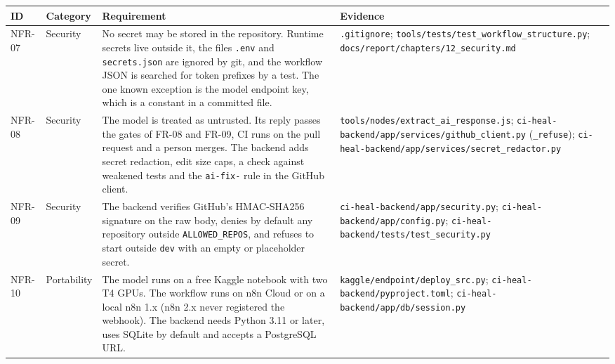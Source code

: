 \begin{table}[!htbp]
\centering
\footnotesize
\begin{tabularx}{\linewidth}{>{\raggedright\arraybackslash}p{1.4cm}>{\raggedright\arraybackslash}p{2.3cm}>{\raggedright\arraybackslash}X>{\raggedright\arraybackslash}X}
\toprule
\textbf{ID} & \textbf{Category} & \textbf{Requirement} & \textbf{Evidence} \\
\midrule
NFR-07 & Security & No secret may be stored in the repository. Runtime secrets live outside it, the files \texttt{.env} and \texttt{secrets.json} are ignored by git, and the workflow JSON is searched for token prefixes by a test. The one known exception is the model endpoint key, which is a constant in a committed file. & \texttt{.gitignore}; \texttt{tools/\allowbreak{}tests/\allowbreak{}test\_\allowbreak{}workflow\_\allowbreak{}structure.py}; \texttt{docs/\allowbreak{}report/\allowbreak{}chapters/\allowbreak{}12\_\allowbreak{}security.md} \\
NFR-08 & Security & The model is treated as untrusted. Its reply passes the gates of FR-08 and FR-09, CI runs on the pull request and a person merges. The backend adds secret redaction, edit size caps, a check against weakened tests and the \texttt{ai-fix-} rule in the GitHub client. & \texttt{tools/\allowbreak{}nodes/\allowbreak{}extract\_\allowbreak{}ai\_\allowbreak{}response.js}; \texttt{ci-heal-backend/\allowbreak{}app/\allowbreak{}services/\allowbreak{}github\_\allowbreak{}client.py} (\texttt{\_refuse}); \texttt{ci-heal-backend/\allowbreak{}app/\allowbreak{}services/\allowbreak{}secret\_\allowbreak{}redactor.py} \\
NFR-09 & Security & The backend verifies GitHub's HMAC-SHA256 signature on the raw body, denies by default any repository outside \texttt{ALLOWED\_REPOS}, and refuses to start outside \texttt{dev} with an empty or placeholder secret. & \texttt{ci-heal-backend/\allowbreak{}app/\allowbreak{}security.py}; \texttt{ci-heal-backend/\allowbreak{}app/\allowbreak{}config.py}; \texttt{ci-heal-backend/\allowbreak{}tests/\allowbreak{}test\_\allowbreak{}security.py} \\
NFR-10 & Portability & The model runs on a free Kaggle notebook with two T4 GPUs. The workflow runs on n8n Cloud or on a local n8n 1.x (n8n 2.x never registered the webhook). The backend needs Python 3.11 or later, uses SQLite by default and accepts a PostgreSQL URL. & \texttt{kaggle/\allowbreak{}endpoint/\allowbreak{}deploy\_\allowbreak{}src.py}; \texttt{ci-heal-backend/\allowbreak{}pyproject.toml}; \texttt{ci-heal-backend/\allowbreak{}app/\allowbreak{}db/\allowbreak{}session.py} \\

\end{tabularx}
\end{table}
